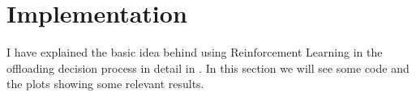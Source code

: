 \documentclass{article}
\begin{document}
%
%
%
\section{Implementation}
I have explained the basic idea behind using Reinforcement Learning in the offloading decision process in detail in \cite{adityaRL}.
In this section we will see some code and the plots showing some relevant results.
\end{document}
